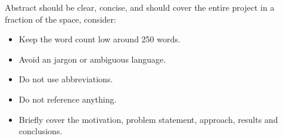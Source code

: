 

\noindent
Abstract should be clear, concise, and should cover the entire project in a fraction of the space, consider:

\begin{itemize}
\item Keep the word count low around 250 words.
\item Avoid an jargon or ambiguous language.
\item Do not use abbreviations.
\item Do not reference anything.
\item Briefly cover the motivation, problem statement, approach, results and conclusions.
\end{itemize}

\smallskip

